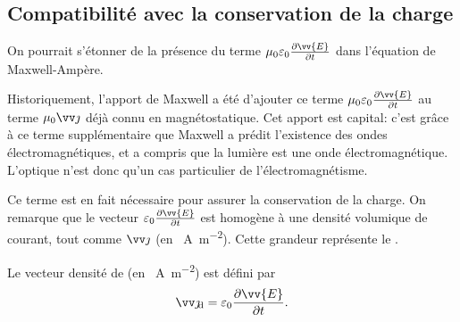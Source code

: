 \documentclass[12pt,fancy]{cours}
\begin{document}



\subsection{Compatibilité avec la conservation de la charge}
\label{subsec:compatibilité_cons_charge}
On pourrait s’étonner de la présence du terme $\mu_0\varepsilon_0\frac{\partial \vv{E}}{\partial t}$ dans l’équation de  Maxwell-Ampère. 


\begin{remarque}
Historiquement, l'apport de Maxwell a été d’ajouter ce terme $\mu_0\varepsilon_0\frac{\partial \vv{E}}{\partial t}$ au terme $\mu_0\j$ déjà connu en magnétostatique.
Cet apport est capital: c'est grâce à ce terme supplémentaire que Maxwell a prédit l'existence des ondes électromagnétiques, et a compris que la lumière est une onde électromagnétique. L'optique n'est donc qu'un cas particulier de l'électromagnétisme.
  
\end{remarque}
   Ce terme est en fait nécessaire pour assurer la conservation de la charge.
On remarque que le vecteur $\varepsilon_0\frac{\partial \vv{E}}{\partial t}$
est homogène à une densité volumique de courant, tout comme $\j$ (en \SI{}{A.m^{-2}}). Cette grandeur représente le .
\begin{definition}\label{def:}
Le vecteur densité de  (en \SI{}{A.m^{-2}}) est défini par
$$
\jd = \varepsilon_0\frac{\partial \vv{E}}{\partial t}.
$$
\end{definition}
\end{document}
